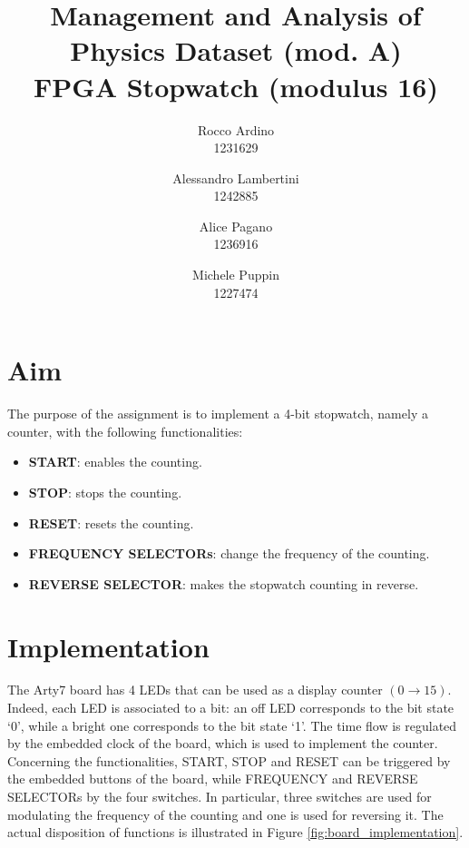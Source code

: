 \documentclass[11pt, a4paper]{article}
\begin{document}
\author{Rocco Ardino\\1231629  \and Alessandro Lambertini\\ 1242885 \and Alice Pagano \\1236916 \and Michele Puppin \\ 1227474}
\title{\textbf{Management and Analysis of Physics Dataset (mod. A) \\ FPGA  Stopwatch (modulus 16)}}
\maketitle

\section{Aim}
The purpose of the assignment is to implement a 4-bit stopwatch, namely a counter, with the following functionalities:
\begin{itemize}
\item \textbf{START}: enables the counting.
\item \textbf{STOP}: stops the counting.
\item \textbf{RESET}: resets the counting.
\item \textbf{FREQUENCY SELECTORs}: change the frequency of the counting.
\item \textbf{REVERSE SELECTOR}: makes the stopwatch counting in reverse.
\end{itemize}





\section{Implementation}
The Arty7 board has 4 LEDs that can be used as a display counter \( (0 \rightarrow 15) \). Indeed, each LED is associated to a bit: an off LED corresponds to the bit state `0', while a bright one corresponds to the bit state `1'. The time flow is regulated by the embedded clock of the board, which is used to implement the counter.
Concerning the functionalities, START, STOP and RESET can be triggered by the embedded buttons of the board,  while FREQUENCY and REVERSE SELECTORs by the four switches. In particular, three switches are used for modulating the frequency of the counting and one is used for reversing it. The actual disposition of functions is illustrated in Figure \ref{fig:board_implementation}.
\end{document}
